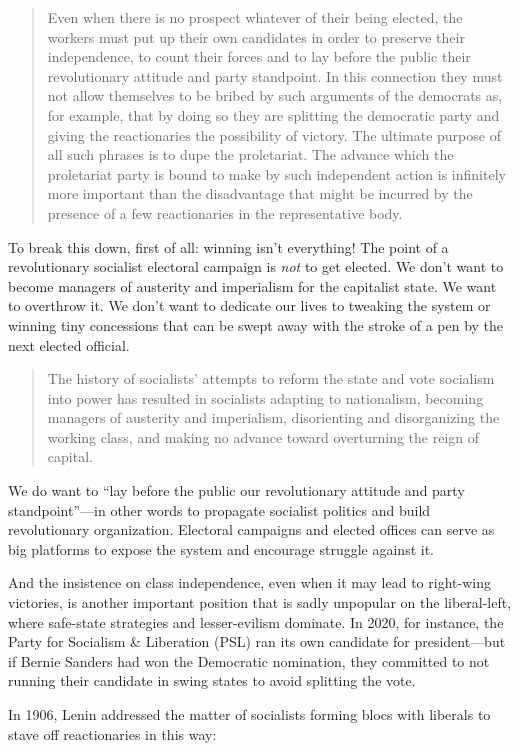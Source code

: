 \blockquote{Even when there is no prospect whatever of their being elected, the workers must put up their own candidates in order to preserve their independence, to count their forces and to lay before the public their revolutionary attitude and party standpoint. In this connection they must not allow themselves to be bribed by such arguments of the democrats as, for example, that by doing so they are splitting the democratic party and giving the reactionaries the possibility of victory. The ultimate purpose of all such phrases is to dupe the proletariat. The advance which the proletariat party is bound to make by such independent action is infinitely more important than the disadvantage that might be incurred by the presence of a few reactionaries in the representative body.}

To break this down, first of all: winning isn't everything! The point of a revolutionary socialist electoral campaign is \emph{not} to get elected. We don't want to become managers of austerity and imperialism for the capitalist state. We want to overthrow it. We don't want to dedicate our lives to tweaking the system or winning tiny concessions that can be swept away with the stroke of a pen by the next elected official.

\blockquote{The history of socialists' attempts to reform the state and vote socialism into power has resulted in socialists adapting to nationalism, becoming managers of austerity and imperialism, disorienting and disorganizing the working class, and making no advance toward overturning the reign of capital.}

We do want to ``lay before the public our revolutionary attitude and party standpoint''---in other words to propagate socialist politics and build revolutionary organization. Electoral campaigns and elected offices can serve as big platforms to expose the system and encourage struggle against it.

And the insistence on class independence, even when it may lead to right-wing victories, is another important position that is sadly unpopular on the liberal-left, where safe-state strategies and lesser-evilism dominate. In 2020, for instance, the Party for Socialism \& Liberation (PSL) ran its own candidate for president---but if Bernie Sanders had won the Democratic nomination, they committed to not running their candidate in swing states to avoid splitting the vote.

In 1906, Lenin addressed the matter of socialists forming blocs with liberals to stave off reactionaries in this way:

